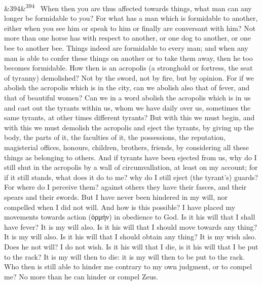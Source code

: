 \documentclass[12pt]{article}
\newcommand{\para}[1][]{\par\noindent\ifx&#1&\else\textsuperscript{\footnotesize #1}~\fi}
\begin{document}
\para[394] When then you are thus affected towards things, what man can any longer be formidable to you? For what has a man which is formidable to another, either when you see him or speak to him or finally are conversant with him? Not more than one horse has with respect to another, or one dog to another, or one bee to another bee. Things indeed are formidable to every man; and when any man is able to confer these things on another or to take them away, then he too becomes formidable. How then is an acropolis (a stronghold or fortress, the seat of tyranny) demolished? Not by the sword, not by fire, but by opinion. For if we abolish the acropolis which is in the city, can we abolish also that of fever, and that of beautiful women? Can we in a word abolish the acropolis which is in us and cast out the tyrants within us, whom we have daily over us, sometimes the same tyrants, at other times different tyrants? But with this we must begin, and with this we must demolish the acropolis and eject the tyrants, by giving up the body, the parts of it, the faculties of it, the possessions, the reputation, magisterial offices, honours, children, brothers, friends, by considering all these things as belonging to others. And if tyrants have been ejected from us, why do I still shut in the acropolis by a wall of circumvallation, at least on my account; for if it still stands, what does it do to me? why do I still eject (the tyrant's) guards? For where do I perceive them? against others they have their fasces, and their spears and their swords. But I have never been hindered in my will, nor compelled when I did not will. And how is this possible? I have placed my movements towards action (ὁρμήν) in obedience to God. Is it his will that I shall have fever? It is my will also. Is it his will that I should move towards any thing? It is my will also. Is it his will that I should obtain any thing? It is my wish also. Does he not will? I do not wish. Is it his will that I die, is it his will that I be put to the rack? It is my will then to die: it is my will then to be put to the rack. Who then is still able to hinder me contrary to my own judgment, or to compel me? No more than he can hinder or compel Zeus.
\end{document}
